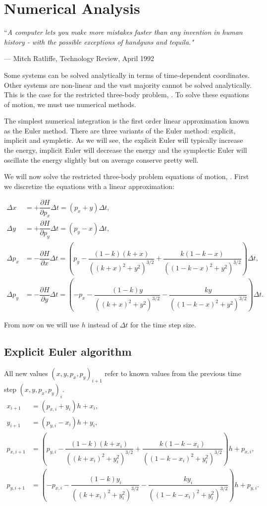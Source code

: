 \chapter{Numerical Analysis} \label{ch:numerical-analysis}
\epigraph{``\itshape{A computer lets you make more mistakes faster than any invention in human history - with the possible exceptions of handguns and tequila.}"}{--- \textup{Mitch Ratliffe}, Technology Review, April 1992}

Some systems can be solved analytically in terms of time-dependent coordinates. Other systems are non-linear and the vast majority cannot be solved analytically. This is the case for the restricted three-body problem, . To solve these equations of motion, we must use numerical methods.

The simplest numerical integration is the first order linear approximation known as the Euler method. There are three variants of the Euler method: explicit, implicit and sympletic. As we will see, the explicit Euler will typically increase the energy, implicit Euler will decrease the energy and the symplectic Euler will oscillate the energy slightly but on average conserve pretty well.

We will now solve the restricted three-body problem equations of motion, . First we discretize the equations with a linear approximation:

\begin{align}
\Delta x &= +\dfrac{\partial H}{\partial p_x}\Delta t = (p_x + y)\Delta t, \\[0.2cm]
\Delta y &= +\dfrac{\partial H}{\partial p_y}\Delta t = (p_y - x)\Delta t, \\[0.2cm]
\Delta p_x &= -\dfrac{\partial H}{\partial x}\Delta t = \left(p_y - \dfrac{(1-k)(k+x)}{((k+x)^2+y^2)^{3/2}} + \dfrac{k(1-k-x)}{((1-k-x)^2+y^2)^{3/2}}\right)\Delta t, \\[0.2cm]
\Delta p_y &= -\dfrac{\partial H}{\partial y}\Delta t = \left(-p_x - \dfrac{(1-k)y}{((k+x)^2+y^2)^{3/2}} - \dfrac{k y}{((1-k-x)^2+y^2)^{3/2}}\right)\Delta t.
\end{align}

From now on we will use $h$ instead of $\Delta t$ for the time step size.

\section{Explicit Euler algorithm}
All new values $(x,y,p_x,p_y)_{i+1}$ refer to known values from the previous time step $(x,y,p_x,p_y)_i$.
\begin{align}
x_{i+1} &= (p_{x,i} + y_i)h + x_i, \\[0.2cm]
y_{i+1} &= (p_{y,i} - x_i)h + y_i, \\[0.2cm]
p_{x,i+1} &= \left(p_{y,i} - \dfrac{(1-k)(k+x_i)}{((k+x_i)^2+y_i^2)^{3/2}} + \dfrac{k(1-k-x_i)}{((1-k-x_i)^2+y_i^2)^{3/2}}\right)h + p_{x,i}, \\[0.2cm]
p_{y,i+1} &= \left(-p_{x,i} - \dfrac{(1-k)y_i}{((k+x_i)^2+y_i^2)^{3/2}} - \dfrac{k y_i}{((1-k-x_i)^2+y_i^2)^{3/2}}\right)h + p_{y,i}.
\end{align}

